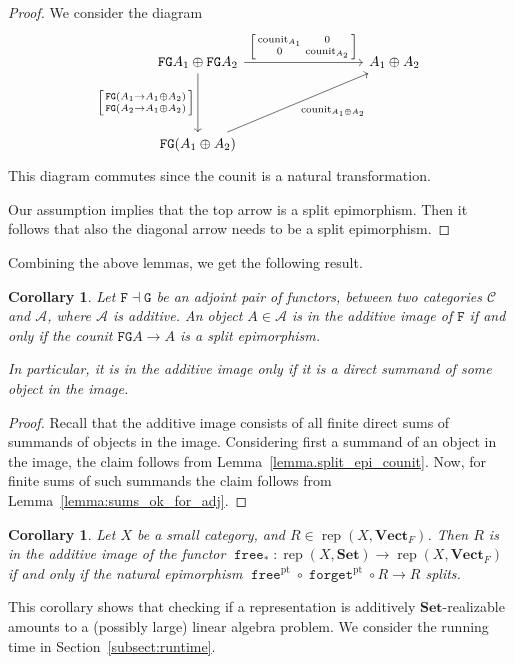 \documentclass[a4paper]{amsart}
\theoremstyle{plain}
\newtheorem{corollary}[theorem]{Corollary}
\theoremstyle{definition}
\theoremstyle{remark}
\newcommand{\funct}[1]{\operatorname{\mathtt{#1}}}
\newcommand{\Set}{\mathbf{Set}}
\newcommand{\VectF}{\mathbf{Vect}_F}
\DeclareMathOperator{\rep}{rep}
\begin{document}
\begin{proof}
We consider the diagram
\[ \begin{tikzcd}[column sep=30mm,row sep=15mm,ampersand replacement=\&]
\mathtt F \mathtt G A_1 \oplus \mathtt F \mathtt G A_2 \ar[r,"{\left[ \begin{smallmatrix} \operatorname{counit}_{A_1} & 0 \\ 0 & \operatorname{counit}_{A_2} \end{smallmatrix} \right]}"] \ar[d,swap,"{\left[ \begin{smallmatrix} \mathtt F \mathtt G (A_1 \to A_1 \oplus A_2) \\ \mathtt F \mathtt G (A_2 \to A_1 \oplus A_2) \end{smallmatrix} \right]}"] \& A_1 \oplus A_2 \\
\mathtt F \mathtt G (A_1 \oplus A_2) \ar[ru,swap,"\operatorname{counit}_{A_1 \oplus A_2}"]
\end{tikzcd} \]
This diagram commutes since the counit is a natural transformation.

Our assumption implies that the top arrow is a split epimorphism. Then it follows that also the diagonal arrow needs to be a split epimorphism.
\end{proof}

Combining the above lemmas, we get the following result.

\begin{corollary} \label{cor.adj_summand}
Let \( \mathtt F \dashv \mathtt G \) be an adjoint pair of functors, between two categories \( \mathcal{C} \) and \( \mathcal{A} \), where \( \mathcal{A} \) is additive. An object \( A \in \mathcal{A} \) is in the additive image of \( \mathtt F \) if and only if the counit \( \mathtt F \mathtt G A \to A \) is a split epimorphism.

In particular, it is in the additive image only if it is a direct summand of some object in the image.
\end{corollary}

\begin{proof}
Recall that the additive image consists of all finite direct sums of summands of objects in the image. Considering first a summand of an object in the image, the claim follows from Lemma~\ref{lemma.split_epi_counit}. Now, for finite sums of such summands the claim follows from Lemma~\ref{lemma:sums_ok_for_adj}. 
\end{proof}

\begin{corollary} \label{cor.criterion_for_add_image}
Let \( X \) be a small category, and \( R \in \rep( X, \VectF) \). Then \( R \) is in the additive image of the functor \( \funct{free}_* \colon \rep( X, \Set ) \to \rep( X, \VectF) \) if and only if the natural epimorphism \( \funct{free}^\mathrm{pt} \circ \funct{forget}^\mathrm{pt} \circ R \to R \) splits.
\end{corollary}
This corollary shows that checking if a representation is additively $\Set$-realizable amounts to a (possibly large) linear algebra problem. We consider the running time in Section~\ref{subsect:runtime}.
\end{document}
